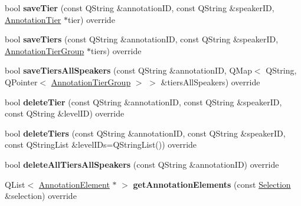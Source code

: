 \begin{DoxyCompactItemize}
bool {\bfseries save\+Tier} (const Q\+String \&annotation\+ID, const Q\+String \&speaker\+ID, \hyperlink{class_annotation_tier}{Annotation\+Tier} $\ast$tier) override
\item 
\mbox{\label{class_x_m_l_annotation_datastore_a08ae8140907028db310bfcb181822b78}} 
bool {\bfseries save\+Tiers} (const Q\+String \&annotation\+ID, const Q\+String \&speaker\+ID, \hyperlink{class_annotation_tier_group}{Annotation\+Tier\+Group} $\ast$tiers) override
\item 
\mbox{\label{class_x_m_l_annotation_datastore_ac6c686bd194c6ade6d15293d61046325}} 
bool {\bfseries save\+Tiers\+All\+Speakers} (const Q\+String \&annotation\+ID, Q\+Map$<$ Q\+String, Q\+Pointer$<$ \hyperlink{class_annotation_tier_group}{Annotation\+Tier\+Group} $>$ $>$ \&tiers\+All\+Speakers) override
\item 
\mbox{\label{class_x_m_l_annotation_datastore_acfecfd5881f2253669d1b0ebe55268c2}} 
bool {\bfseries delete\+Tier} (const Q\+String \&annotation\+ID, const Q\+String \&speaker\+ID, const Q\+String \&level\+ID) override
\item 
\mbox{\label{class_x_m_l_annotation_datastore_a1fdbfe756107e2c2167e5a5a5389f45b}} 
bool {\bfseries delete\+Tiers} (const Q\+String \&annotation\+ID, const Q\+String \&speaker\+ID, const Q\+String\+List \&level\+I\+Ds=Q\+String\+List()) override
\item 
\mbox{\label{class_x_m_l_annotation_datastore_a4ed247001864f9f0b8cb74ca236e0123}} 
bool {\bfseries delete\+All\+Tiers\+All\+Speakers} (const Q\+String \&annotation\+ID) override
\item 
\mbox{\label{class_x_m_l_annotation_datastore_aa9d913427340f0f1c658a79668d754a5}} 
Q\+List$<$ \hyperlink{class_annotation_element}{Annotation\+Element} $\ast$ $>$ {\bfseries get\+Annotation\+Elements} (const \hyperlink{class_annotation_datastore_1_1_selection}{Selection} \&selection) override
\item 
\mbox{\label{class_x_m_l_annotation_datastore_ac1523131e510ea156be93be626a5defb}} 

\end{DoxyCompactItemize}
